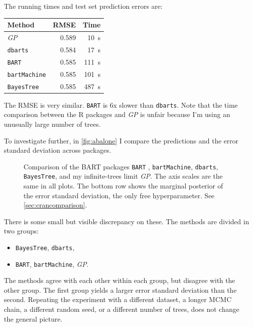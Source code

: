 \documentclass[a4paper]{article}
\theoremstyle{definition}
\newcommand{\widecenter}[1]{\noindent\hspace{-\textwidth}\makebox[3\textwidth][c]{#1}}
\newcommand{\includempl}[1]{\texttt{[image: \#1]}}
\begin{document}
    The running times and test set prediction errors are:
    \begin{center}
        \begin{tabular}{lrr}
            \toprule
            Method & RMSE & Time \\
            \midrule
            \emph{GP} & 0.589 & \SI{10}s \\
            \texttt{dbarts} & 0.584 & \SI{17}s \\
            \texttt{BART} & 0.585 & \SI{111}s \\
            \texttt{bartMachine} & 0.585 & \SI{101}s \\
            \texttt{BayesTree} & 0.585 & \SI{487}s \\
            \bottomrule
        \end{tabular}
    \end{center}
    The RMSE is very similar. \texttt{BART} is 6x slower than \texttt{dbarts}. Note that the time comparison between the R packages and \emph{GP} is unfair because I'm using an unusually large number of trees.

    To investigate further, in \autoref{fig:abalone} I compare the predictions and the error standard deviation across packages.
    \begin{figure}
        
        \widecenter{\includempl{comparison-Abalone-burnin1000-samp1000-tree1000}}
        
        \caption{\label{fig:abalone} Comparison of the BART packages \texttt{BART} , \texttt{bartMachine}, \texttt{dbarts}, \texttt{BayesTree}, and my infinite-trees limit \emph{GP}. The axis scales are the same in all plots. The bottom row shows the marginal posterior of the error standard deviation, the only free hyperparameter. See \autoref{sec:crancomparison}.}
        
    \end{figure}
    There is some small but visible discrepancy on these. The methods are divided in two groups:
    \begin{itemize}
        \item \texttt{BayesTree}, \texttt{dbarts},
        \item \texttt{BART}, \texttt{bartMachine}, \emph{GP}.
    \end{itemize}
    The methods agree with each other within each group, but disagree with the other group. The first group yields a larger error standard deviation than the second. Repeating the experiment with a different dataset, a longer MCMC chain, a different random seed, or a different number of trees, does not change the general picture.
\end{document}

